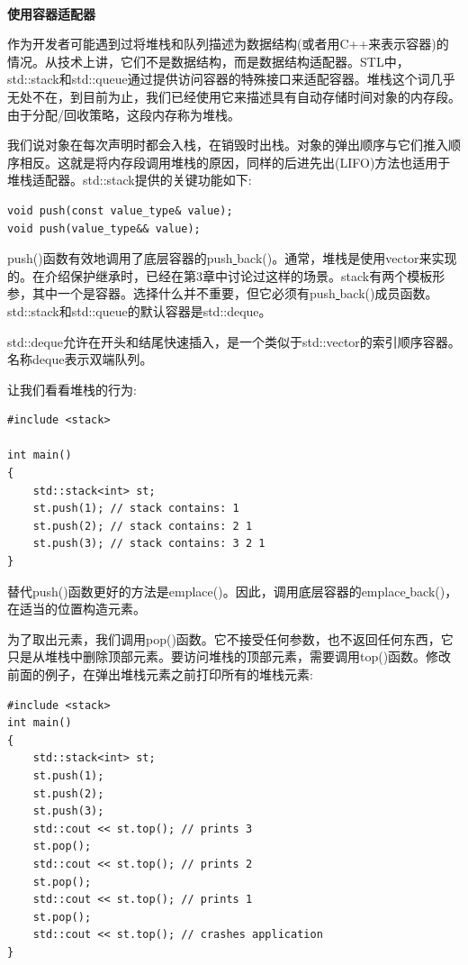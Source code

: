 \noindent\textbf{}\ \par
\textbf{使用容器适配器} \ \par
作为开发者可能遇到过将堆栈和队列描述为数据结构(或者用C++来表示容器)的情况。从技术上讲，它们不是数据结构，而是数据结构适配器。STL中，std::stack和std::queue通过提供访问容器的特殊接口来适配容器。堆栈这个词几乎无处不在，到目前为止，我们已经使用它来描述具有自动存储时间对象的内存段。由于分配/回收策略，这段内存称为堆栈。 \par
我们说对象在每次声明时都会入栈，在销毁时出栈。对象的弹出顺序与它们推入顺序相反。这就是将内存段调用堆栈的原因，同样的后进先出(LIFO)方法也适用于堆栈适配器。std::stack提供的关键功能如下: \par

\begin{lstlisting}[caption={}]
void push(const value_type& value);
void push(value_type&& value);
\end{lstlisting}

push()函数有效地调用了底层容器的push\underline{ }back()。通常，堆栈是使用vector来实现的。在介绍保护继承时，已经在第3章中讨论过这样的场景。stack有两个模板形参，其中一个是容器。选择什么并不重要，但它必须有push\underline{ }back()成员函数。std::stack和std::queue的默认容器是std::deque。\par
std::deque允许在开头和结尾快速插入，是一个类似于std::vector的索引顺序容器。名称deque表示双端队列。 \par
让我们看看堆栈的行为: \par

\begin{lstlisting}[caption={}]
#include <stack>

int main()
{
	std::stack<int> st;
	st.push(1); // stack contains: 1
	st.push(2); // stack contains: 2 1
	st.push(3); // stack contains: 3 2 1
}
\end{lstlisting}

替代push()函数更好的方法是emplace()。因此，调用底层容器的emplace\underline{ }back()，在适当的位置构造元素。 \par
为了取出元素，我们调用pop()函数。它不接受任何参数，也不返回任何东西，它只是从堆栈中删除顶部元素。要访问堆栈的顶部元素，需要调用top()函数。修改前面的例子，在弹出堆栈元素之前打印所有的堆栈元素: \par

\begin{lstlisting}[caption={}]
#include <stack>
int main()
{
	std::stack<int> st;
	st.push(1);
	st.push(2);
	st.push(3);
	std::cout << st.top(); // prints 3
	st.pop();
	std::cout << st.top(); // prints 2
	st.pop();
	std::cout << st.top(); // prints 1
	st.pop();
	std::cout << st.top(); // crashes application
}
\end{lstlisting}

